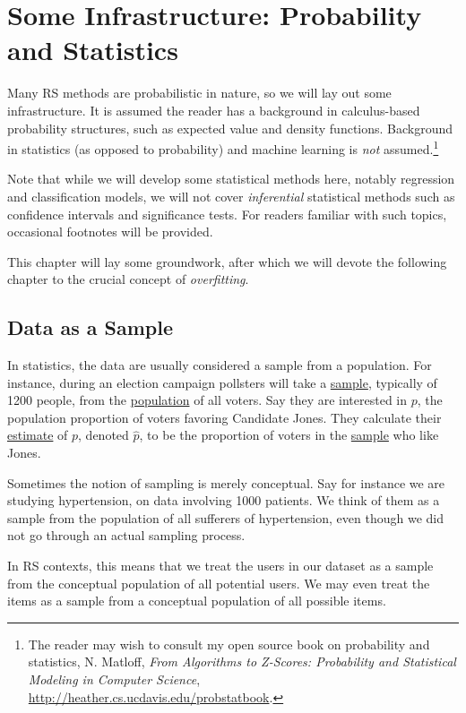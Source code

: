 \chapter{Some Infrastructure: Probability and Statistics}
\label{chap:infra2}

Many RS methods are probabilistic in nature, so we will lay out some
infrastructure.  It is assumed the reader has a background in
calculus-based probability structures, such as expected value and
density functions.  Background in statistics (as opposed to probability)
and machine learning is \textit{not} assumed.\footnote{The reader may
wish to consult my open source book on probability and statistics, N.
Matloff, \textit{From Algorithms to Z-Scores: Probability and
Statistical Modeling in Computer Science},
\url{http://heather.cs.ucdavis.edu/probstatbook}.}

Note that while we will develop some statistical methods here, notably
regression and classification models, we will not cover
\textit{inferential} statistical methods such as confidence intervals
and significance tests.  For readers familiar with such topics,
occasional footnotes will be provided. 

This chapter will lay some groundwork, after which we will devote the
following chapter to the crucial concept of \textit{overfitting}.  

\section{Data as a Sample}

In statistics, the data are usually considered a sample from a
population.  For instance, during an election campaign pollsters will
take a \underline{sample}, typically of 1200 people, from the
\underline{population} of all voters.  Say they are interested in $p$,
the population proportion of voters favoring Candidate Jones. They
calculate their \underline{estimate} of $p$, denoted $\widehat{p}$, to
be the proportion of voters in the \underline{sample} who like Jones.

Sometimes the notion of sampling is merely conceptual. Say for instance
we are studying hypertension, on data involving 1000 patients.  We think
of them as a sample from the population of all sufferers of
hypertension, even though we did not go through an actual sampling
process.

In RS contexts, this means that we treat the users in our dataset as a
sample from the conceptual population of all potential users.  We may
even treat the items as a sample from a conceptual population of all
possible items.

